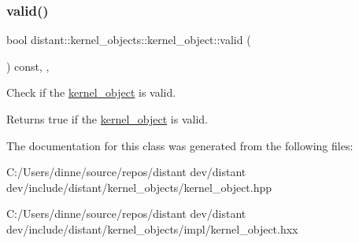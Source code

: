 \subsubsection{\texorpdfstring{valid()}{valid()}}
{\footnotesize\ttfamily bool distant\+::kernel\+\_\+objects\+::kernel\+\_\+object\+::valid (\begin{DoxyParamCaption}{ }\end{DoxyParamCaption}) const\hspace{0.3cm}{\ttfamily [inline]}, {\ttfamily [virtual]}, {\ttfamily [noexcept]}}



Check if the \mbox{\hyperlink{classdistant_1_1kernel__objects_1_1kernel__object}{kernel\+\_\+object}} is valid. 

\begin{DoxyReturn}{Returns}
true if the \mbox{\hyperlink{classdistant_1_1kernel__objects_1_1kernel__object}{kernel\+\_\+object}} is valid. 
\end{DoxyReturn}


The documentation for this class was generated from the following files\+:\begin{DoxyCompactItemize}
\item 
C\+:/\+Users/dinne/source/repos/distant dev/distant dev/include/distant/kernel\+\_\+objects/kernel\+\_\+object.\+hpp\item 
C\+:/\+Users/dinne/source/repos/distant dev/distant dev/include/distant/kernel\+\_\+objects/impl/kernel\+\_\+object.\+hxx\end{DoxyCompactItemize}
